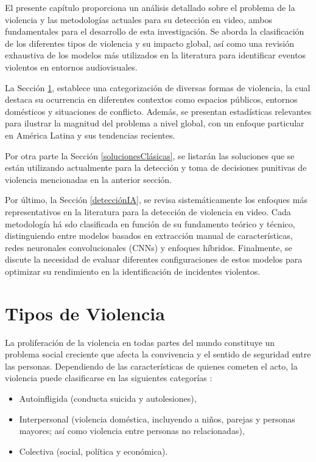 El presente capítulo proporciona un análisis detallado sobre el
problema de la violencia y las metodologías actuales para su
detección en video, ambos fundamentales para el desarrollo de
esta investigación. Se aborda la clasificación de
los diferentes tipos de violencia y su impacto global, así como
una revisión exhaustiva de los modelos más utilizados en la
literatura para identificar eventos violentos en entornos
audiovisuales.

La Sección \ref{tiposDeViolencia}, establece una categorización de
diversas formas de violencia, la cual destaca su ocurrencia en
diferentes contextos como espacios públicos, entornos
domésticos y situaciones de conflicto. Además, se presentan
estadísticas relevantes para ilustrar la magnitud del problema
a nivel global, con un enfoque particular en América Latina y
sus tendencias recientes.

Por otra parte la Sección \ref{solucionesClásicas}, se listarán las soluciones 
que se están utilizando actualmente para la detección y toma de 
decisiones punitivas de violencia mencionadas en la anterior 
sección.

Por último, la Sección \ref{detecciónIA}, se revisa sistemáticamente 
los enfoques más representativos en la literatura para la
detección de violencia en video. Cada metodología há sdo 
clasificada en función de su fundamento teórico y técnico,
distinguiendo entre modelos basados en extracción manual de
características, redes neuronales convolucionales (CNNs) y
enfoques híbridos. Finalmente, se discute la necesidad de
evaluar diferentes configuraciones de estos modelos para
optimizar su rendimiento en la identificación de incidentes
violentos.


\section{Tipos de Violencia}\label{tiposDeViolencia}
La proliferación de la violencia en todas partes del mundo
constituye un problema social creciente que afecta la convivencia
y el sentido de seguridad entre las personas. Dependiendo de las
características de quienes cometen el acto, la violencia puede
clasificarse en las siguientes categorías \cite{OMS2014}: 
\begin{itemize} 
    \item Autoinfligida (conducta suicida y autolesiones), 
    \item Interpersonal (violencia doméstica, incluyendo a niños, parejas y personas mayores; así como violencia entre personas no relacionadas), 
    \item Colectiva (social, política y económica). 
\end{itemize}

